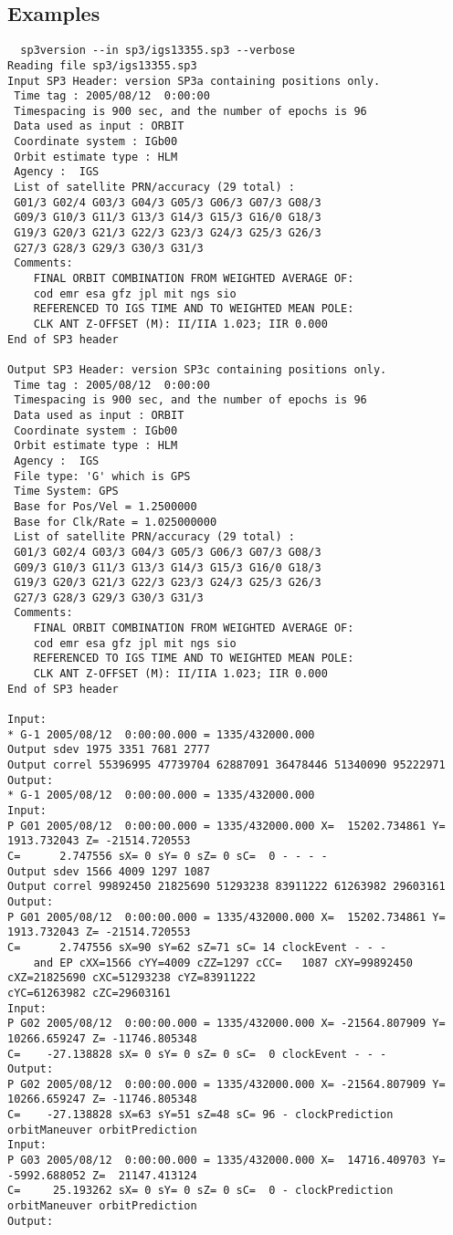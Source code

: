 \subsection{Examples}
\begin{verbatim}
  sp3version --in sp3/igs13355.sp3 --verbose
Reading file sp3/igs13355.sp3
Input SP3 Header: version SP3a containing positions only.
 Time tag : 2005/08/12  0:00:00
 Timespacing is 900 sec, and the number of epochs is 96
 Data used as input : ORBIT
 Coordinate system : IGb00
 Orbit estimate type : HLM
 Agency :  IGS
 List of satellite PRN/accuracy (29 total) :
 G01/3 G02/4 G03/3 G04/3 G05/3 G06/3 G07/3 G08/3
 G09/3 G10/3 G11/3 G13/3 G14/3 G15/3 G16/0 G18/3
 G19/3 G20/3 G21/3 G22/3 G23/3 G24/3 G25/3 G26/3
 G27/3 G28/3 G29/3 G30/3 G31/3
 Comments:
    FINAL ORBIT COMBINATION FROM WEIGHTED AVERAGE OF:        
    cod emr esa gfz jpl mit ngs sio                          
    REFERENCED TO IGS TIME AND TO WEIGHTED MEAN POLE:        
    CLK ANT Z-OFFSET (M): II/IIA 1.023; IIR 0.000            
End of SP3 header

Output SP3 Header: version SP3c containing positions only.
 Time tag : 2005/08/12  0:00:00
 Timespacing is 900 sec, and the number of epochs is 96
 Data used as input : ORBIT
 Coordinate system : IGb00
 Orbit estimate type : HLM
 Agency :  IGS
 File type: 'G' which is GPS
 Time System: GPS
 Base for Pos/Vel = 1.2500000
 Base for Clk/Rate = 1.025000000
 List of satellite PRN/accuracy (29 total) :
 G01/3 G02/4 G03/3 G04/3 G05/3 G06/3 G07/3 G08/3
 G09/3 G10/3 G11/3 G13/3 G14/3 G15/3 G16/0 G18/3
 G19/3 G20/3 G21/3 G22/3 G23/3 G24/3 G25/3 G26/3
 G27/3 G28/3 G29/3 G30/3 G31/3
 Comments:
    FINAL ORBIT COMBINATION FROM WEIGHTED AVERAGE OF:        
    cod emr esa gfz jpl mit ngs sio                          
    REFERENCED TO IGS TIME AND TO WEIGHTED MEAN POLE:        
    CLK ANT Z-OFFSET (M): II/IIA 1.023; IIR 0.000            
End of SP3 header

Input:
* G-1 2005/08/12  0:00:00.000 = 1335/432000.000
Output sdev 1975 3351 7681 2777
Output correl 55396995 47739704 62887091 36478446 51340090 95222971
Output:
* G-1 2005/08/12  0:00:00.000 = 1335/432000.000
Input:
P G01 2005/08/12  0:00:00.000 = 1335/432000.000 X=  15202.734861 Y=   1913.732043 Z= -21514.720553 
C=      2.747556 sX= 0 sY= 0 sZ= 0 sC=  0 - - - -
Output sdev 1566 4009 1297 1087
Output correl 99892450 21825690 51293238 83911222 61263982 29603161
Output:
P G01 2005/08/12  0:00:00.000 = 1335/432000.000 X=  15202.734861 Y=   1913.732043 Z= -21514.720553 
C=      2.747556 sX=90 sY=62 sZ=71 sC= 14 clockEvent - - -
    and EP cXX=1566 cYY=4009 cZZ=1297 cCC=   1087 cXY=99892450 cXZ=21825690 cXC=51293238 cYZ=83911222 
cYC=61263982 cZC=29603161
Input:
P G02 2005/08/12  0:00:00.000 = 1335/432000.000 X= -21564.807909 Y=  10266.659247 Z= -11746.805348 
C=    -27.138828 sX= 0 sY= 0 sZ= 0 sC=  0 clockEvent - - -
Output:
P G02 2005/08/12  0:00:00.000 = 1335/432000.000 X= -21564.807909 Y=  10266.659247 Z= -11746.805348 
C=    -27.138828 sX=63 sY=51 sZ=48 sC= 96 - clockPrediction orbitManeuver orbitPrediction
Input:
P G03 2005/08/12  0:00:00.000 = 1335/432000.000 X=  14716.409703 Y=  -5992.688052 Z=  21147.413124 
C=     25.193262 sX= 0 sY= 0 sZ= 0 sC=  0 - clockPrediction orbitManeuver orbitPrediction
Output:

\end{verbatim}


%
